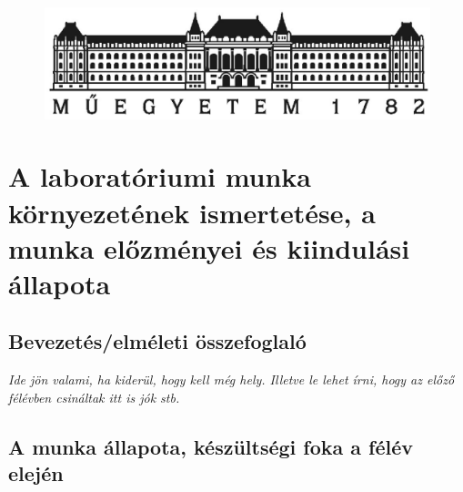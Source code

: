 \documentclass[a4paper,oneside]{article}
\begin{document}
\onehalfspacing
\frenchspacing


\begin{titlepage}
 \begin{figure}[h]
    \centering
      \includegraphics[width=12cm]{bme_logo.eps}
  \label{fig:bme_logo}
  \end{figure}
  \thispagestyle{empty}
  \onlabcim

  
 
\end{titlepage} 

\section{A laboratóriumi munka környezetének ismertetése, a munka előzményei és kiindulási állapota}
\label{sec:bevezeto}

\subsection{Bevezetés/elméleti összefoglaló}
\label{sec:bevez-ossz}

\textit{Ide jön valami, ha kiderül, hogy kell még hely. Illetve le lehet írni, hogy az előző félévben csináltak itt is jók stb.}

\subsection{A munka állapota, készültségi foka a félév elején}
\label{sec:munka-allap-kesz}
\end{document}
